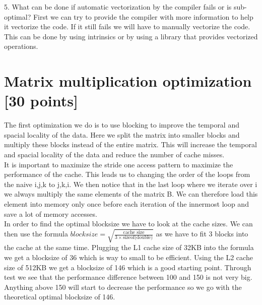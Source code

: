\documentclass[unicode,11pt,a4paper,oneside,numbers=endperiod,openany]{scrartcl}
\begin{document}
5. What can be done if automatic vectorization by the compiler fails or is sub-optimal?
First we can try to provide the compiler with more information to help it vectorize the code.
If it still fails we will have to manually vectorize the code. 
This can be done by using intrinsics or by using a library that provides vectorized operations.

\section{Matrix multiplication optimization [30 points]}

The first optimization we do is to use blocking to improve the temporal and spacial locality of the data.
Here we split the matrix into smaller blocks and multiply these blocks instead of the entire matrix.
This will increase the temporal and spacial locality of the data and reduce the number of cache misses.
\\
It is important to maximize the stride one access pattern to maximize the performance of the cache. 
This leads us to changing the order of the loops from the naive i,j,k to j,k,i. 
We then notice that in the last loop where we iterate over i we always multiply the same elements of the matrix B.
We can therefore load this element into memory only once before each iteration of the innermost loop and save a lot of memory accesses.
\\
In order to find the optimal blocksize we have to look at the cache sizes.
We can then use the formula $blocksize = \sqrt{\frac{{\text{{cache size}}}}{{3 \times \text{{sizeof(double)}}}}}$ as we have to fit 3 blocks into the cache at the same time.
Plugging the L1 cache size of 32KB into the formula we get a blocksize of 36 which is way to small to be efficient.
Using the L2 cache size of 512KB we get a blocksize of 146 which is a good starting point.
Through test we see that the performance difference between 100 and 150 is not very big. 
Anything above 150 will start to decrease the performance so we go with the theoretical optimal blocksize of 146.
\end{document}
